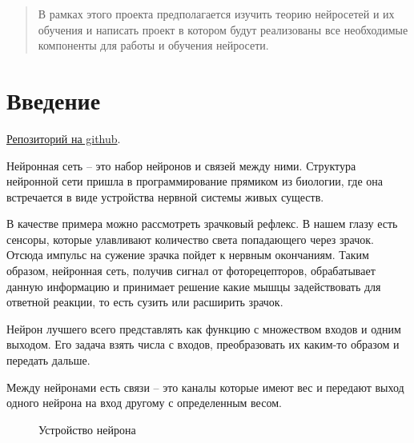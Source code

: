 \documentclass{article}
\begin{document}
\makeTitlePage

\tableofcontents


\newpage

\begin{abstract}
В рамках этого проекта предполагается изучить теорию нейросетей и их обучения и написать проект в котором будут реализованы все необходимые компоненты для работы и обучения нейросети.
\end{abstract}


\section{Введение}
\begin{center}
    \href{https://github.com/toobrainless/NeuralNetwork}{Репозиторий на github}.
\end{center}

Нейронная сеть -- это набор нейронов и связей между ними. Структура нейронной сети пришла в программирование прямиком из биологии, где она встречается в виде устройства нервной системы живых существ.

В качестве примера можно рассмотреть зрачковый рефлекс. В нашем глазу есть сенсоры, которые улавливают количество света попадающего через зрачок. Отсюда импульс на сужение зрачка пойдет к нервным окончаниям. Таким образом, нейронная сеть, получив сигнал от фоторецепторов, обрабатывает данную информацию и принимает решение какие мышцы задействовать для ответной реакции, то есть сузить или расширить зрачок.

Нейрон лучшего всего представлять как функцию с множеством входов и одним выходом. Его задача взять числа с входов, преобразовать их каким-то образом и передать дальше.

Между нейронами есть связи -- это каналы которые имеют вес и передают выход одного нейрона на вход другому с определенным весом.

\begin{figure}[h]
\caption{Устройство нейрона}
\end{figure}
\end{document}
